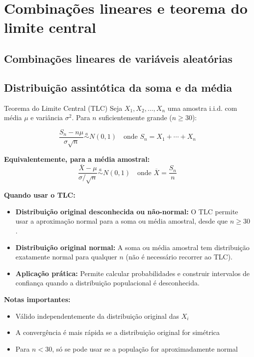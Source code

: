 \documentclass[a4paper,12pt]{article}
\begin{document}
\newpage

\section{\color{sectioncolor}Combinações lineares e teorema do limite central}
\subsection{Combinações lineares de variáveis aleatórias}

\subsection{Distribuição assintótica da soma e da média}

\begin{formulabox}{Teorema do Limite Central (TLC)}
Seja $X_1, X_2, \ldots, X_n$ uma amostra i.i.d. com média $\mu$ e variância $\sigma^2$. Para $n$ suficientemente grande ($n \geq 30$):

\begin{equation}\label{formula22}\tag{Fórmula 22}
    \frac{S_n - n\mu}{\sigma\sqrt{n}} \overset{a}{\sim} N(0,1) \quad \text{onde } S_n = X_1 + \cdots + X_n
\end{equation}

\textbf{Equivalentemente, para a média amostral:}
\begin{equation}\label{formula22a}\tag{Fórmula 22a}
    \frac{\overline{X} - \mu}{\sigma/\sqrt{n}} \overset{a}{\sim} N(0,1) \quad \text{onde } \overline{X} = \frac{S_n}{n}
\end{equation}

\textbf{Quando usar o TLC:}
\begin{itemize}
    \item \textbf{Distribuição original desconhecida ou não-normal:} O TLC permite usar a aproximação normal para a soma ou média amostral, desde que $n \geq 30$.
    \item \textbf{Distribuição original normal:} A soma ou média amostral tem distribuição exatamente normal para qualquer $n$ (não é necessário recorrer ao TLC).
    \item \textbf{Aplicação prática:} Permite calcular probabilidades e construir intervalos de confiança quando a distribuição populacional é desconhecida.
\end{itemize}

\textbf{Notas importantes:}
\begin{itemize}
    \item Válido independentemente da distribuição original das $X_i$
    \item A convergência é mais rápida se a distribuição original for simétrica
    \item Para $n < 30$, só se pode usar se a população for aproximadamente normal
\end{itemize}
\end{formulabox}
\end{document}
